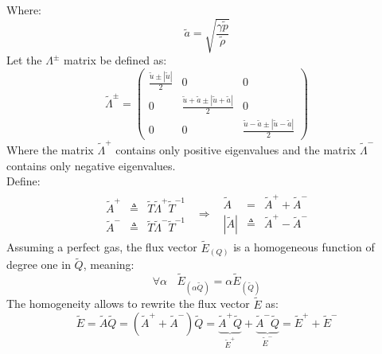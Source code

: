 \documentclass[11pt, a4paper]{article}
\begin{document}
Where:
\begin{equation*}
    \tilde{a}=\sqrt{\frac{\gamma\tilde{p}}{\tilde{\rho}}}
\end{equation*}
Let the $\Lambda^\pm$ matrix be defined as:
\begin{equation}
    \tilde{\Lambda}^\pm=\begin{pmatrix}
        \displaystyle\frac{\tilde{u}\pm\left|\tilde{u}\right|}{2} & 0 & 0 \\
        0 & \displaystyle\frac{\tilde{u}+\tilde{a}\pm\left|\tilde{u}+\tilde{a}\right|}{2} & 0 \\
        0 & 0 & \displaystyle\frac{\tilde{u}-\tilde{a}\pm\left|\tilde{u}-\tilde{a}\right|}{2}
    \end{pmatrix}
\end{equation}
Where the matrix $\tilde{\Lambda}^+$ contains only positive eigenvalues and the matrix $\tilde{\Lambda}^-$ contains only negative eigenvalues. \\ Define:
\begin{equation}
    \begin{matrix}
        \begin{array}{ccl}
            \tilde{A}^+ & \triangleq & \tilde{T}\tilde{\Lambda}^+\tilde{T}^{-1} \\
            \tilde{A}^- & \triangleq & \tilde{T}\tilde{\Lambda}^-\tilde{T}^{-1}
        \end{array} & \Rightarrow & \begin{array}{ccl}
            \tilde{A} & = & \tilde{A}^++\tilde{A}^- \\
            \left|\tilde{A}\right| & \triangleq & \tilde{A}^+-\tilde{A}^-
        \end{array}
    \end{matrix}
\end{equation}
Assuming a perfect gas, the flux vector $\tilde{E}_{\left(Q\right)}$ is a homogeneous function of degree one in $\tilde{Q}$, meaning:$$\forall\alpha\ \ \ \ \tilde{E}_{\left(\alpha \tilde{Q}\right)}=\alpha \tilde{E}_{\left(\tilde{Q}\right)}$$The homogeneity allows to rewrite the flux vector $\tilde{E}$ as:
\begin{equation}
    \tilde{E}=\tilde{A}\tilde{Q}=\left(\tilde{A}^++\tilde{A}^-\right)\tilde{Q}=\underbrace{\tilde{A}^+\tilde{Q}}_{\tilde{E}^+}+\underbrace{\tilde{A}^-\tilde{Q}}_{\tilde{E}^-}=\tilde{E}^++\tilde{E}^-
\end{equation} 
\end{document}
